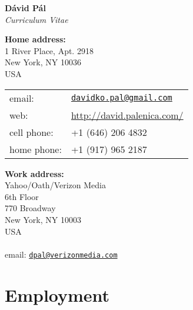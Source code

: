 \documentclass[9pt]{article}
\begin{document}
\begin{center}
{\huge \textbf{D\'avid P\'al}} \\[0.2cm]
\emph{Curriculum Vitae}
\end{center}

\vspace{0.2cm}

%
\noindent
\begin{minipage}[t]{10cm}
\textbf{Home address:} \\
1 River Place, Apt. 2918 \\
New York, NY 10036 \\
USA \\

\begin{tabular}{@{}ll}
email:       & \href{mailto:davidko.pal@gmail.com}{\texttt{davidko.pal@gmail.com}} \\
web:         & \url{http://david.palenica.com/} \\
cell phone:  & +1 (646) 206 4832 \\
home phone:  & +1 (917) 965 2187 \\
\end{tabular}
\end{minipage}
%
\begin{minipage}[t]{10cm}
\textbf{Work address:} \\
Yahoo/Oath/Verizon Media \\
6th Floor \\
770 Broadway \\
New York, NY 10003 \\
USA \\
\\
email: \href{mailto:dpal@verizonmedia.com}{\texttt{dpal@verizonmedia.com}} \\
\end{minipage}

\section*{Employment}
\end{document}

